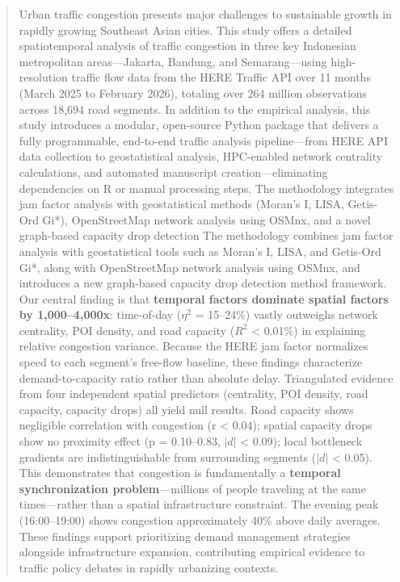 \documentclass[12pt,a4paper]{article}
\begin{document}
\begin{abstract}
Urban traffic congestion presents major challenges to sustainable growth in rapidly growing Southeast Asian cities. This study offers a detailed spatiotemporal analysis of traffic congestion in three key Indonesian metropolitan areas—Jakarta, Bandung, and Semarang—using high-resolution traffic flow data from the HERE Traffic API over 11 months (March 2025 to February 2026), totaling over 264 million observations across 18,694 road segments. In addition to the empirical analysis, this study introduces a modular, open-source Python package that delivers a fully programmable, end-to-end traffic analysis pipeline—from HERE API data collection to geostatistical analysis, HPC-enabled network centrality calculations, and automated manuscript creation—eliminating dependencies on R or manual processing steps. The methodology integrates jam factor analysis with geostatistical methods (Moran's I, LISA, Getis-Ord Gi*), OpenStreetMap network analysis using OSMnx, and a novel graph-based capacity drop detection The methodology combines jam factor analysis with geostatistical tools such as Moran's I, LISA, and Getis-Ord Gi*, along with OpenStreetMap network analysis using OSMnx, and introduces a new graph-based capacity drop detection method framework. Our central finding is that \textbf{temporal factors dominate spatial factors by 1,000--4,000x}: time-of-day ($\eta^2$ = 15--24\%) vastly outweighs network centrality, POI density, and road capacity ($R^2$ < 0.01\%) in explaining relative congestion variance. Because the HERE jam factor normalizes speed to each segment's free-flow baseline, these findings characterize demand-to-capacity ratio rather than absolute delay. Triangulated evidence from four independent spatial predictors (centrality, POI density, road capacity, capacity drops) all yield null results. Road capacity shows negligible correlation with congestion (r < 0.04); spatial capacity drops show no proximity effect (p = 0.10--0.83, $|d|$ < 0.09); local bottleneck gradients are indistinguishable from surrounding segments ($|d|$ < 0.05). This demonstrates that congestion is fundamentally a \textbf{temporal synchronization problem}---millions of people traveling at the same times---rather than a spatial infrastructure constraint. The evening peak (16:00--19:00) shows congestion approximately 40\% above daily averages. These findings support prioritizing demand management strategies alongside infrastructure expansion, contributing empirical evidence to traffic policy debates in rapidly urbanizing contexts.
\end{abstract}
\end{document}
